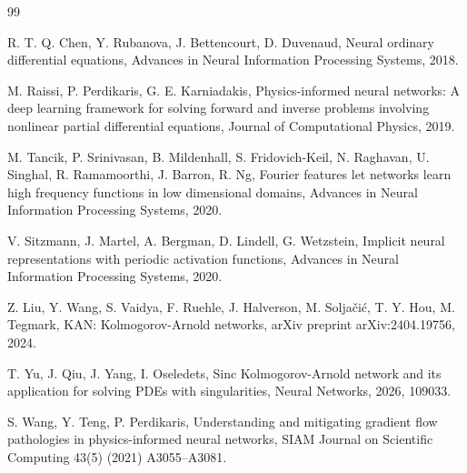 \documentclass[preprint,12pt]{elsarticle}
\begin{document}

\begin{thebibliography}{99}

R. T. Q. Chen, Y. Rubanova, J. Bettencourt, D. Duvenaud,
Neural ordinary differential equations,
Advances in Neural Information Processing Systems, 2018.

M. Raissi, P. Perdikaris, G. E. Karniadakis,
Physics-informed neural networks: A deep learning framework for solving forward and inverse problems involving nonlinear partial differential equations,
Journal of Computational Physics, 2019.

M. Tancik, P. Srinivasan, B. Mildenhall, S. Fridovich-Keil, N. Raghavan, U. Singhal, R. Ramamoorthi, J. Barron, R. Ng,
Fourier features let networks learn high frequency functions in low dimensional domains,
Advances in Neural Information Processing Systems, 2020.

V. Sitzmann, J. Martel, A. Bergman, D. Lindell, G. Wetzstein,
Implicit neural representations with periodic activation functions,
Advances in Neural Information Processing Systems, 2020.

Z. Liu, Y. Wang, S. Vaidya, F. Ruehle, J. Halverson, M. Solja\v{c}i\'{c}, T. Y. Hou, M. Tegmark,
KAN: Kolmogorov-Arnold networks,
arXiv preprint arXiv:2404.19756, 2024.

T. Yu, J. Qiu, J. Yang, I. Oseledets,
Sinc Kolmogorov-Arnold network and its application for solving PDEs with singularities,
Neural Networks, 2026, 109033.

S. Wang, Y. Teng, P. Perdikaris,
Understanding and mitigating gradient flow pathologies in physics-informed neural networks,
SIAM Journal on Scientific Computing 43(5) (2021) A3055--A3081.

\end{thebibliography}
\end{document}
